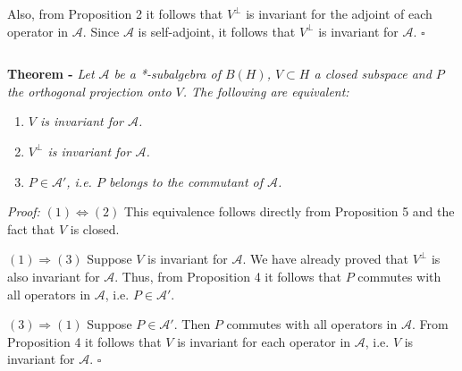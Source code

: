 \documentclass[12pt]{article}
\begin{document}
Also, from Proposition 2 it follows that $V^{\perp}$ is invariant for the adjoint of each operator in $\mathcal{A}$. Since $\mathcal{A}$ is self-adjoint, it follows that $V^{\perp}$ is invariant for $\mathcal{A}$.  $\square$

$\,$

{\bf Theorem -} \emph{Let $\mathcal{A}$ be a *-subalgebra of $B(H)$, $V \subset H$ a closed subspace and $P$ the orthogonal projection onto $V$. The following are equivalent:}
\begin{enumerate}
\item \emph{$V$ is invariant for $\mathcal{A}$.}
\item \emph{$V^{\perp}$ is invariant for $\mathcal{A}$.}
\item \emph{$P \in \mathcal{A}'$, i.e. $P$ belongs to the commutant of $\mathcal{A}$.}
\end{enumerate}


\emph{Proof:} $(1) \Longleftrightarrow (2)$ This equivalence follows directly from Proposition 5 and the fact that $V$ is closed.

$(1) \Longrightarrow (3)$ Suppose $V$ is invariant for $\mathcal{A}$. We have already proved that $V^{\perp}$ is also invariant for $\mathcal{A}$. Thus, from Proposition 4 it follows that $P$ commutes with all operators in $\mathcal{A}$, i.e. $P \in \mathcal{A}'$.

$(3) \Longrightarrow (1)$ Suppose $P \in \mathcal{A}'$. Then $P$ commutes with all operators in $\mathcal{A}$. From Proposition 4 it follows that $V$ is invariant for each operator in $\mathcal{A}$, i.e. $V$ is invariant for $\mathcal{A}$. $\square$
\end{document}
